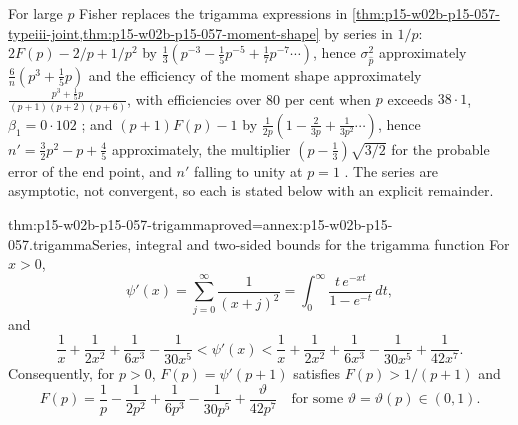 For large \(p\) Fisher replaces the trigamma expressions in
\cref{thm:p15-w02b-p15-057-typeiii-joint,thm:p15-w02b-p15-057-moment-shape}
by series in \(1/p\): \(2F(p)-2/p+1/p^2\) by
\(\tfrac13(p^{-3}-\tfrac15p^{-5}+\tfrac17p^{-7}\cdots)\), hence
\(\sigma_{\hat p}^2\) approximately \(\frac6n(p^3+\tfrac15p)\) and the
efficiency of the moment shape approximately
\(\frac{p^3+\frac15p}{(p+1)(p+2)(p+6)}\), with efficiencies over 80 per
cent when \(p\) exceeds \(38{\cdot}1\), \(\beta_1=0{\cdot}102\)
\cite[pp.~335--336]{Fisher1922Foundations}; and \((p+1)F(p)-1\) by
\(\frac1{2p}(1-\frac2{3p}+\frac1{3p^2}\cdots)\), hence
\(n'=\tfrac32p^2-p+\tfrac45\) approximately, the multiplier
\((p-\tfrac13)\sqrt{3/2}\) for the probable error of the end point, and
\(n'\) falling to unity at \(p=1\) \cite[p.~337]{Fisher1922Foundations}.
The series are asymptotic, not convergent, so each is stated below with
an explicit remainder.

\begin{hblemma}{thm:p15-w02b-p15-057-trigamma}{proved=annex:p15-w02b-p15-057.trigamma}{Series, integral and two-sided bounds for the trigamma function}
For \(x>0\),
\[
 \psi'(x)=\sum_{j=0}^{\infty}\frac1{(x+j)^2}
 =\int_0^\infty\frac{t\,e^{-xt}}{1-e^{-t}}\,dt ,
\]
and
\[
 \frac1x+\frac1{2x^2}+\frac1{6x^3}-\frac1{30x^5}<\psi'(x)<
 \frac1x+\frac1{2x^2}+\frac1{6x^3}-\frac1{30x^5}+\frac1{42x^7}.
\]
Consequently, for \(p>0\), \(F(p)=\psi'(p+1)\) satisfies
\(F(p)>1/(p+1)\) and
\[
 F(p)=\frac1p-\frac1{2p^2}+\frac1{6p^3}-\frac1{30p^5}+\frac{\vartheta}{42p^7}
 \quad\text{for some }\vartheta=\vartheta(p)\in(0,1).
\]
\end{hblemma}

